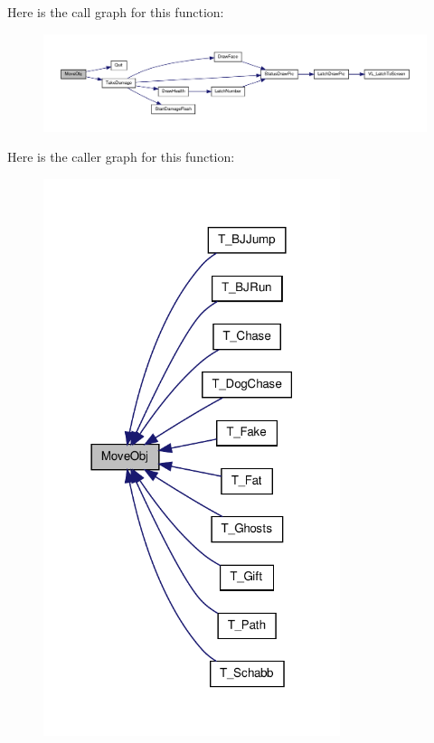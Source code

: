 Here is the call graph for this function:
\nopagebreak
\begin{figure}[H]
\begin{center}
\leavevmode
\includegraphics[width=400pt]{WL__DEF_8H_acc590a0c3cb09dd88e7727cbed040ec4_cgraph}
\end{center}
\end{figure}




Here is the caller graph for this function:
\nopagebreak
\begin{figure}[H]
\begin{center}
\leavevmode
\includegraphics[width=246pt]{WL__DEF_8H_acc590a0c3cb09dd88e7727cbed040ec4_icgraph}
\end{center}
\end{figure}


